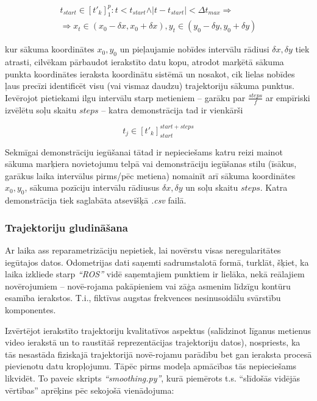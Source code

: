 \documentclass[12pt, a4paper]{article}
\numberwithin{equation}{section} %
\begin{document}
\begin{multline}
    t_{start} \in [t'_{k}]^p_1: t < t_{start} \land \vert t - t_{start} \vert < \Delta t_{max} \Rightarrow \\ \Rightarrow x_t \in (x_{0} - \delta x, x_{0} + \delta x ), y_t \in  (y_{0} - \delta y, y_{0} + \delta y )
\end{multline}

kur sākuma koordinātes $x_0, y_0$ un pieļaujamie nobīdes intervālu rādiusi $\delta x, \delta y$ tiek atrasti, cilvēkam pārbaudot ierakstīto datu kopu, atrodot marķētā sākuma punkta koordinātes ieraksta koordinātu sistēmā un nosakot, cik lielas nobīdes ļaus precīzi identificēt visu (vai vismaz daudzu) trajektoriju sākuma punktus. Ievērojot pietiekami ilgu intervālu starp metieniem -- garāku par $\frac{steps}{f}$ ar empīriski izvēlētu soļu skaitu $steps$ --  katra demonstrācija tad ir vienkārši 

\begin{equation}
    t_{j} \in [t'_{k}]^{start+steps}_{start}
\end{equation}

Sekmīgai demonstrāciju iegūšanai tātad ir nepieciešams katru reizi mainot sākuma marķiera novietojumu telpā vai demonstrāciju iegūšanas stilu (īsākus, garākus laika intervālus pirms/pēc metiena) nomainīt arī sākuma koordinātes $x_0, y_0$, sākuma pozīciju intervālu rādiusus $\delta x, \delta y$ un soļu skaitu $steps$. Katra demonstrācija tiek saglabāta atsevišķā \textit{.csv} failā.

\subsubsection{Trajektoriju gludināšana}

Ar laika ass reparametrizāciju nepietiek, lai novērstu visas neregularitātes iegūtajos datos. Odometrijas dati saņemti sadrumstalotā formā, turklāt, šķiet, ka laika izkliede starp \textit{``ROS''} vidē saņemtajiem punktiem ir lielāka, nekā reālajiem novērojumiem -- novē-rojama pakāpieniem vai zāģa asmenim līdzīgu kontūru esamība ierakstos. T.i., fiktīvas augstas frekvences nesinusoidālu svārstību komponentes. 

Izvērtējot ierakstīto trajektoriju kvalitatīvos aspektus (salīdzinot līganus metienus video ierakstā un to raustītāš reprezentācijas trajektoriju datos), nospriests, ka tās nesastāda fiziskajā trajektorijā novē-rojamu parādību bet gan ieraksta procesā pievienotu datu kropļojumu. Tāpēc pirms modeļa apmācības tās nepieciešams likvidēt. To paveic skripts \textit{``smoothing.py''}, kurā piemērots t.s. ``slīdošās vidējās vērtības'' aprēķins pēc sekojošā vienādojuma:
\end{document}
